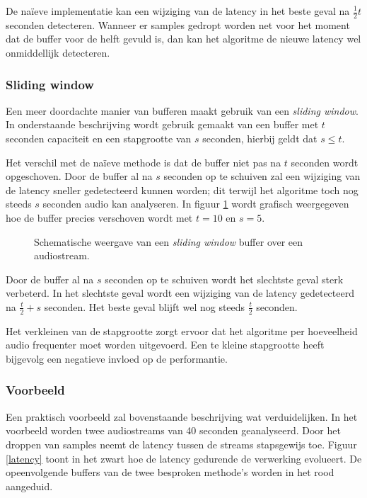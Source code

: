 De naïeve implementatie kan een wijziging van de latency in het beste geval na $ \frac{1}{2} t $ seconden detecteren. Wanneer er samples gedropt worden net voor het moment dat de buffer voor de helft gevuld is, dan kan het algoritme de nieuwe latency wel onmiddellijk detecteren.

\subsubsection{Sliding window}

Een meer doordachte manier van bufferen maakt gebruik van een \textit{sliding window}. In onderstaande beschrijving wordt gebruik gemaakt van een buffer met $ t $ seconden capaciteit en een stapgrootte van $ s $ seconden, hierbij geldt dat $ s \leq t $. 

Het verschil met de naïeve methode is dat de buffer niet pas na $ t $ seconden wordt opgeschoven. Door de buffer al na $ s $ seconden op te schuiven zal een wijziging van de latency sneller gedetecteerd kunnen worden; dit terwijl het algoritme toch nog steeds $ s $ seconden audio kan analyseren. In figuur \ref{slidingwindow} wordt grafisch weergegeven hoe de buffer precies verschoven wordt met $ t = 10 $ en $ s = 5 $.

\begin{figure}[h!]
	\captionsetup{width=0.7\textwidth}
	\caption[Schematische weergave van de buffer]{Schematische weergave van een \textit{sliding window} buffer over een audiostream.}
	\begin{center}
		\advance\parskip0.3cm
		
	\end{center}
	\label{slidingwindow}
\end{figure}

Door de buffer al na $ s $ seconden op te schuiven wordt het slechtste geval sterk verbeterd. In het slechtste geval wordt een wijziging van de latency gedetecteerd na $ \frac{t}{2} + s $ seconden. Het beste geval blijft wel nog steeds $ \frac{t}{2} $ seconden.

Het verkleinen van de stapgrootte zorgt ervoor dat het algoritme per hoeveelheid audio frequenter moet worden uitgevoerd. Een te kleine stapgrootte heeft bijgevolg een negatieve invloed op de performantie.

\subsubsection{Voorbeeld}

Een praktisch voorbeeld zal bovenstaande beschrijving wat verduidelijken. In het voorbeeld worden twee audiostreams van 40 seconden geanalyseerd. Door het droppen van samples neemt de latency tussen de streams stapsgewijs toe. Figuur \ref{latency} toont in het zwart hoe de latency gedurende de verwerking evolueert. De opeenvolgende buffers van de twee besproken methode's worden in het rood aangeduid. 

